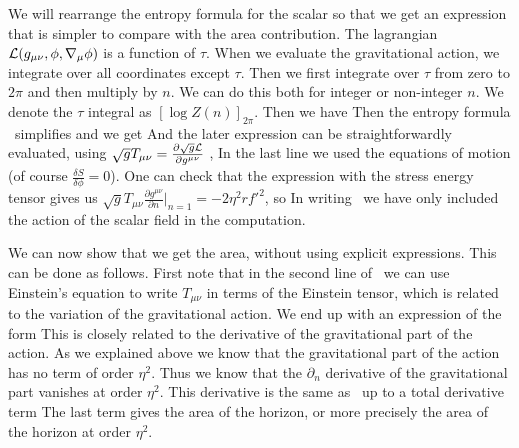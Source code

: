 We will rearrange the entropy formula for the scalar so that  we get an expression that is simpler to compare with the area contribution. The lagrangian $  {\cal{L}}(g_{\mu \nu},\phi,\nabla_{\mu} \phi) $ is a function of
$\tau$. When we evaluate the gravitational action, we integrate over all coordinates except $\tau$.
Then we first  integrate over $\tau$ from zero to $2 \pi$ and then
multiply by $n$. We can do this both for integer or non-integer $n$.
We denote the $\tau$ integral as $ [ \log Z(n) ]_{2 \pi} $. Then we have
\eqn{}
Then the entropy formula \entrog\ simplifies and we get
\eqn{}
And the later expression can be straightforwardly evaluated, using
$\sqrt{g} T_{\mu \nu}={\partial \sqrt{g} {\cal{L}} \over \partial g^{\mu \nu}}$ ,
\eqn{}
 In the last line we used the equations of motion (of course $\frac{\delta S}{\delta \phi}=0$). One can check that the expression with the stress energy tensor gives us $\sqrt{g} T_{\mu \nu}\frac{\partial g^{\mu \nu}}{\partial n} |_{n=1}=-2 \eta^2 r f'^2$, so
\eqn{}
In writing \EEscala\ we have only included the action of the scalar field in the computation.


We can now show that we get the area, without using explicit expressions. This can be done
as follows. First note that in the second line of \EEscala\ we can use Einstein's equation to write
 $T_{\mu\nu}$ in terms of the Einstein tensor, which is related to the variation of the gravitational
action. We end up with an expression of the form
\eqn{}
 This is closely related to the derivative of the gravitational
part of the action.
As we explained above
we know that the gravitational part of the action has no term of order $\eta^2$.
Thus we know that the $\partial_n$ derivative of the gravitational part vanishes at order $\eta^2$.
This derivative is the same as  \eeng\ up to a total derivative term
\eqn{}
The last term gives the area of the horizon, or more precisely the area of the horizon at order $\eta^2$.

